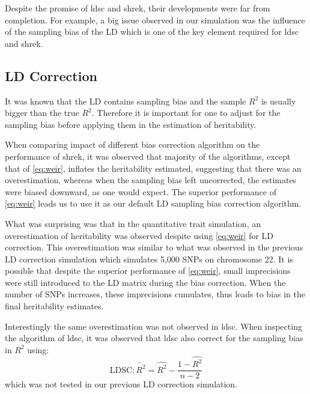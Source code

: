 	Despite the promise of \gls{ldsc} and \gls{shrek}, their developments were far from completion.
	For example, a big issue observed in our simulation was the influence of the sampling bias of the \gls{LD} which is one of the key element required for \gls{ldsc} and \gls{shrek}.
	
	\subsection{LD Correction}
	It was known that the \gls{LD} contains sampling bias and the sample $R^2$ is usually bigger than the true $R^2$.
	Therefore it is important for one to adjust for the sampling bias before applying them in the estimation of heritability.
	
	When comparing impact of different bias correction algorithm on the performance of \gls{shrek}, it was observed that majority of the algorithms, except that of \cref{eq:weir}, inflates the heritability estimated, suggesting that there was an overestimation, whereas when the sampling bias left uncorrected, the estimates were biased downward, as one would expect.
	The superior performance of \cref{eq:weir} leads us to use it as our default \gls{LD} sampling bias correction algorithm.
	
	What was surprising was that in the quantitative trait simulation, an overestimation of heritability was observed despite using \cref{eq:weir} for \gls{LD} correction.
	This overestimation was similar to what was observed in the previous \gls{LD} correction simulation which simulates 5,000 \glspl{SNP} on chromosome 22.
	It is possible that despite the superior performance of \cref{eq:weir}, small imprecisions were still introduced to the \gls{LD} matrix during the bias correction.
	When the number of \glspl{SNP} increases, these imprecisions cumulates, thus leads to bias in the final heritability estimates.
	
	Interestingly the same overestimation was not observed in \gls{ldsc}.
	When inspecting the algorithm of \gls{ldsc}, it was observed that \gls{ldsc} also correct for the sampling bias in $R^2$ using:
	\begin{equation}
	\text{LDSC}: \tilde{R^2}= \hat{R^2}-\frac{1-\hat{R^2}}{n-2}\label{eq:ldscR2} 
	\end{equation}
	which was not tested in our previous \gls{LD} correction simulation.
	
